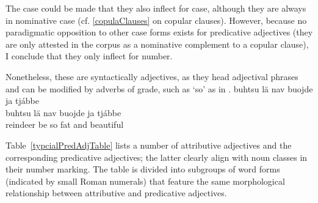 The case could be made that they also inflect for case, although they are always in nominative case (cf. \SEC\ref{copulaClauses} on copular clauses). %
However, because no paradigmatic opposition to other case forms exists for predicative adjectives (they are only attested in the corpus as a nominative complement to a copular clause), I conclude that they only inflect for number. 

Nonetheless, these are syntactically adjectives, as they head adjectival phrases and can be modified by adverbs of grade, such as  ‘so’ as in .
\ea\label{adjPredEx3}
\glll	buhtsu lä nav buojde ja tjábbe\\
	buhtsu lä nav buojde ja tjábbe\\
	reindeer\BS{} be\BS{} so fat\BS{} and beautiful\BS{}\\\nopagebreak
{}	
\z

Table~\vref{typcialPredAdjTable} lists a number of attributive adjectives and the corresponding predicative adjectives; the latter clearly align with noun classes in their number marking. %
The table is divided into subgroups of word forms (indicated by small Roman numerals) that feature the same morphological relationship between attributive and predicative adjectives. 

